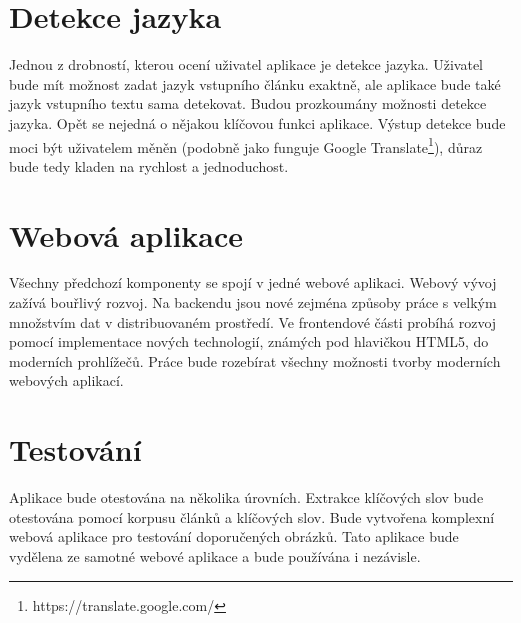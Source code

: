 \section{Detekce jazyka}

Jednou z drobností, kterou ocení uživatel aplikace je detekce jazyka. Uživatel bude mít možnost zadat jazyk vstupního článku exaktně, ale aplikace bude také jazyk vstupního textu sama detekovat. Budou prozkoumány možnosti detekce jazyka. Opět se nejedná o nějakou klíčovou funkci aplikace. Výstup detekce bude moci být uživatelem měněn (podobně jako funguje Google Translate\footnote{https://translate.google.com/}), důraz bude tedy kladen na rychlost a jednoduchost.

\section{Webová aplikace}

Všechny předchozí komponenty se spojí v jedné webové aplikaci. Webový vývoj zažívá bouřlivý rozvoj. Na backendu jsou nové zejména způsoby práce s velkým množstvím dat v distribuovaném prostředí. Ve frontendové části probíhá rozvoj pomocí implementace nových technologií, známých pod hlavičkou HTML5, do moderních prohlížečů. Práce bude rozebírat všechny možnosti tvorby moderních webových aplikací.

\section{Testování}

Aplikace bude otestována na několika úrovních. Extrakce klíčových slov bude otestována pomocí korpusu článků a klíčových slov. Bude vytvořena komplexní webová aplikace pro testování doporučených obrázků. Tato aplikace bude vydělena ze samotné webové aplikace a bude používána i nezávisle.



